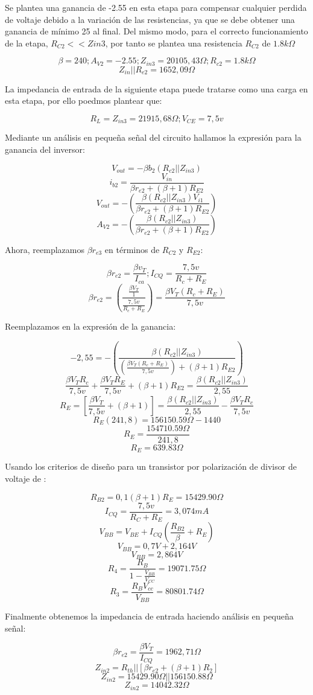 \documentclass[conference]{IEEEtran}
\begin{document}
\begin{center}

Se plantea una ganancia de -2.55 en esta etapa para compensar cualquier perdida de voltaje debido a la variación de las resistencias, ya que se debe obtener una ganancia de mínimo 25 al final. Del mismo modo, para el correcto funcionamiento de la etapa, $R_{C2}<<Z{in3}$, por tanto se plantea una resistencia $R_{C2}$ de $1.8k\Omega$

\[\beta = 240 ; A_{V2}=-2.55 ; Z_{in3}=20105,43 \Omega ; R_{c2}=1.8k \Omega\]
\[Z_{in}|| R_{e2} = 1652,09 \Omega\]

La impedancia de entrada de la siguiente etapa puede tratarse como una carga en esta etapa, por ello poedmos plantear que:

\[R_{L}= Z_{in3}=21915,68 \Omega; V_{CE}=7,5v\]

Mediante un análisis en pequeña señal del circuito hallamos la expresión para la ganancia del inversor:

\[V_{out}=-\beta b_{2} (R_{c2} || Z_{in3})\]
\[i_{b2}= \frac{V_{in}}{\beta r_{e2}+(\beta +1)R_{E2}}\]
\[V_{out}=-(\frac{\beta (R_{c2} || Z_{in3}) V_{i1}}{\beta r_{e2}+(\beta+1)R_{E2}})\]
\[A_{V2} =-(\frac{\beta(R_{c2}||Z_{in3})}{\beta r_{e2}+(\beta +1)R_{E2}})\]

Ahora, reemplazamos $\beta r_{e3}$ en términos de $R_{C2}$ y $R_{E2}$:

\[\beta r_{e2}=\frac{\beta v_{T}}{I_{ca}} ; I_{CQ}= \frac{7,5v}{R_{c}+R_{E}}\]
\[\beta r_{e2}=(\frac{\frac{\beta V_{T}}{1}}{\frac{7,5v}{R_{c}+R_{E}}}) = \frac{\beta V_{T}(R_{c}+R_{E})}{7,5v}\]

Reemplazamos en la expresión de la ganancia:

\[-2,55= -(\frac{\beta(R_{c2}||Z_{in3})}{(\frac{\beta V_{T} (R_{c}+R_{E})}{7,5v})+(\beta+1)R_{E2}})\]
\[\frac{\beta V_{T} R_{c}}{7,5v}+ \frac{\beta V_{T} R_{E}}{7,5v}+ (\beta+1) R_{E2} = \frac{\beta(R_{c2}||Z_{in3})}{2,55}\]
\[R_{E} =[\frac{\beta V_{T}}{7,5v}+(\beta +1)]= \frac{\beta(R_{c2}||Z_{in3})}{2,55}- \frac{\beta V_{T}R_{c}}{7,5v}\]
\[R_{E}(241,8)= 156150.59\Omega - 1440\]
\[R_{E}=\frac{154710.59\Omega}{241,8}\]
\[R_{E} = 639.83\Omega\]

Usando los criterios de diseño para un transistor por polarización de divisor de voltaje de \cite{neamen2009microelectronics}:

\[R_{B2}= 0,1(\beta+1)R_{E}=15429.90\Omega\]
\[I_{CQ}=\frac{7,5v}{R_{C}+R_{E}}=3,074mA\]
\[V_{BB}=V_{BE}+I_{CQ}(\frac{R_{B2}}{\beta}+R_{E})\]
\[V_{BB}=0,7V+2,164V\]
\[V_{BB}=2,864V\]
\[R_{4}= \frac{R_{B}}{1-\frac{V_{BB}}{V_{CC}}} = 19071.75\Omega\]
\[R_{3} = \frac{R_{B} V_{cc}}{V_{BB}}= 80801.74\Omega\]

Finalmente obtenemos la impedancia de entrada haciendo análisis en pequeña señal:

\[\beta r_{e2}= \frac{\beta V_{T}}{I_{CQ}}=1962,71\Omega\]
\[Z_{in2}= R_{th}|| [\beta r_{e2}+(\beta+1)R_{2}]\]
\[Z_{in2}=15429.90\Omega || 156150.88\Omega\]
\[Z_{in2}=14042.32\Omega\]

\end{center}
\end{document}
